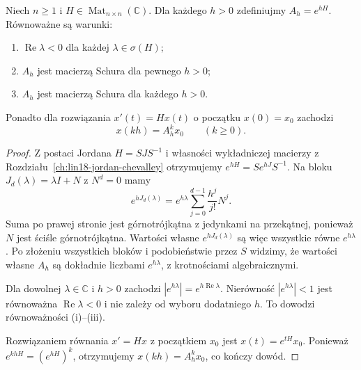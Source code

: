 \begin{twierdzenie}
\label{thm:lin23-sampling}
Niech \(n\ge1\) i
\(H\in\operatorname{Mat}_{n\times n}(\mathbb C)\).
Dla każdego \(h>0\) zdefiniujmy
\(A_h=e^{hH}\).
Równoważne są warunki:
\begin{enumerate}[label=\textup{(\roman*)}]
 \item
 \(\operatorname{Re}\lambda<0\)
 dla każdej \(\lambda\in\sigma(H)\);
 \item \(A_h\) jest macierzą Schura
 dla pewnego \(h>0\);
 \item \(A_h\) jest macierzą Schura
 dla każdego \(h>0\).
\end{enumerate}
Ponadto dla rozwiązania
\(x'(t)=Hx(t)\) o początku
\(x(0)=x_0\) zachodzi
\[
 x(kh)=A_h^kx_0\qquad(k\ge0).
\]
\end{twierdzenie}
\begin{proof}
Z postaci Jordana
\(H=SJS^{-1}\) i własności
wykładniczej macierzy
z Rozdziału~\ref{ch:lin18-jordan-chevalley}
otrzymujemy
\(e^{hH}=Se^{hJ}S^{-1}\).
Na bloku
\(J_d(\lambda)=\lambda I+N\)
z \(N^d=0\)
mamy
\[
 e^{hJ_d(\lambda)}
 =e^{h\lambda}
   \sum_{j=0}^{d-1}\frac{h^j}{j!}N^j.
\]
Suma po prawej stronie
jest górnotrójkątna
z jedynkami na przekątnej,
ponieważ \(N\) jest ściśle
górnotrójkątna.
Wartości własne
\(e^{hJ_d(\lambda)}\)
są więc wszystkie
równe \(e^{h\lambda}\).
Po złożeniu wszystkich bloków
i podobieństwie przez \(S\)
widzimy, że wartości własne \(A_h\)
są dokładnie liczbami
\(e^{h\lambda}\),
z krotnościami algebraicznymi.

Dla dowolnej
\(\lambda\in\mathbb C\) i \(h>0\)
zachodzi
\(|e^{h\lambda}|
 =e^{h\operatorname{Re}\lambda}\).
Nierówność
\(|e^{h\lambda}|<1\)
jest równoważna
\(\operatorname{Re}\lambda<0\)
i nie zależy od wyboru
dodatniego \(h\).
To dowodzi równoważności
(i)--(iii).

Rozwiązaniem równania
\(x'=Hx\) z początkiem \(x_0\)
jest \(x(t)=e^{tH}x_0\).
Ponieważ
\(e^{khH}=(e^{hH})^k\),
otrzymujemy
\(x(kh)=A_h^kx_0\),
co kończy dowód.
\end{proof}

